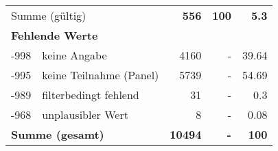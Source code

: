 \begin{longtable}{lXrrr}
     \midrule
     \multicolumn{2}{l}{Summe (gültig)} &
       \textbf{\num{556}} &
     \textbf{100} &
       \textbf{\num[round-mode=places,round-precision=2]{5,3}} \\
     \multicolumn{5}{l}{\textbf{Fehlende Werte}}\\
       -998 &
       keine Angabe &
         \num{4160} &
        - &
         \num[round-mode=places,round-precision=2]{39,64} \\
       -995 &
       keine Teilnahme (Panel) &
         \num{5739} &
        - &
         \num[round-mode=places,round-precision=2]{54,69} \\
       -989 &
       filterbedingt fehlend &
         \num{31} &
        - &
         \num[round-mode=places,round-precision=2]{0,3} \\
       -968 &
       unplausibler Wert &
         \num{8} &
        - &
         \num[round-mode=places,round-precision=2]{0,08} \\
     \midrule
     \multicolumn{2}{l}{\textbf{Summe (gesamt)}} &
          \textbf{\num{10494}} &
        \textbf{-} &
        \textbf{100} \\
     \bottomrule
     \end{longtable}
     
